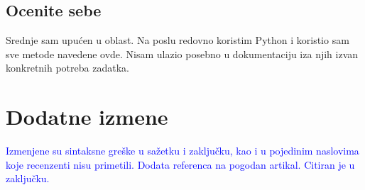 \documentclass[a4paper]{report}
\newcommand{\odgovor}[1]{\textcolor{blue}{#1}}
\begin{document}
\section{Ocenite sebe}
Srednje sam upućen u oblast.
Na poslu redovno koristim Python i koristio sam sve metode navedene ovde. Nisam ulazio posebno u dokumentaciju iza njih izvan konkretnih potreba zadatka.


\chapter{Dodatne izmene}
\odgovor{Izmenjene su sintaksne greške u sažetku i zaključku, kao i u pojedinim naslovima koje recenzenti nisu primetili.}
\odgovor{Dodata referenca na pogodan artikal. Citiran je u zaključku.}
\end{document}
